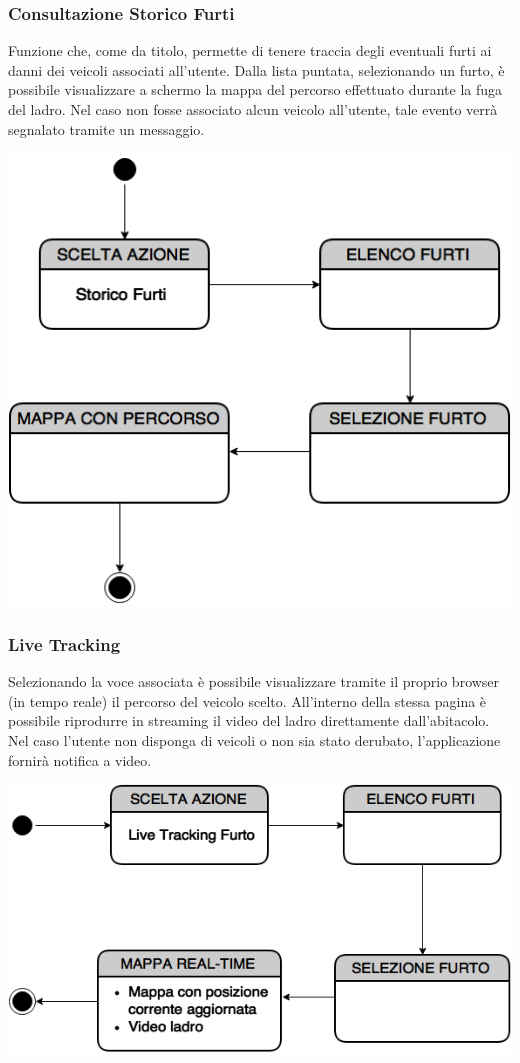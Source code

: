 \documentclass[a4paper,12pt]{beamer}
\begin{document}
\begin{frame}
\frametitle{Consultazione Storico Furti}
Funzione che, come da titolo, permette di tenere traccia degli eventuali furti ai danni dei veicoli associati all'utente. Dalla lista puntata, selezionando un furto, è possibile visualizzare a schermo la mappa del percorso effettuato durante la fuga del ladro. Nel caso non fosse associato alcun veicolo all'utente, tale evento verrà segnalato tramite un messaggio.

\begin{center}
\includegraphics[scale=0.3]{../UseCase/Storico.png}
\end{center}
\end{frame}

\begin{frame}
\frametitle{Live Tracking}
Selezionando la voce associata è possibile visualizzare tramite il proprio browser (in tempo reale) il percorso del veicolo scelto. All'interno della stessa pagina è possibile riprodurre in streaming il video del ladro direttamente dall'abitacolo. Nel caso l'utente non disponga di veicoli o non sia stato derubato, l'applicazione fornirà notifica a video.

\begin{center}
\includegraphics[scale=0.3]{../UseCase/Tracking.png}
\end{center}
\end{frame}
\end{document}
